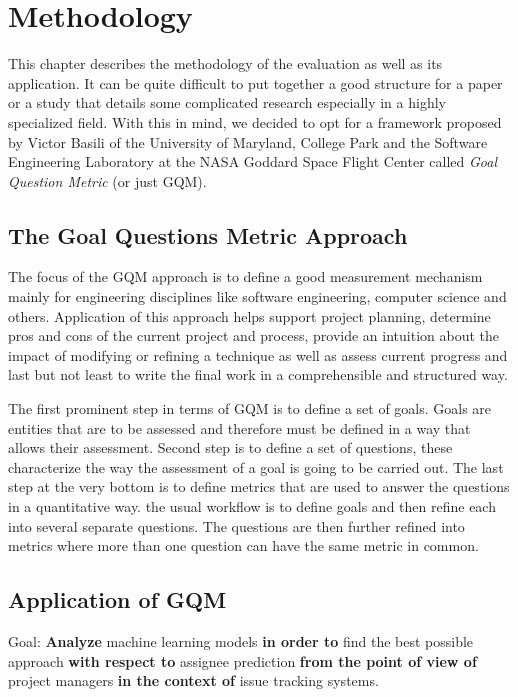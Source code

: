 \chapter{Methodology}

This chapter describes the methodology of the evaluation as well as its application. It can be quite difficult to put together a good structure for a paper or a study that details some complicated research especially in a highly specialized field. With this in mind, we decided to opt for a framework proposed by Victor Basili of the University of Maryland, College Park and the Software Engineering Laboratory at the NASA Goddard Space Flight Center called \textit{Goal Question Metric} (or just GQM).

\section{The Goal Questions Metric Approach}

The focus of the GQM approach is to define a good measurement mechanism mainly for engineering disciplines like software engineering, computer science and others. Application of this approach helps support project planning, determine pros and cons of the current project and process, provide an intuition about the impact of modifying or refining a technique as well as assess current progress and last but not least to write the final work in a comprehensible and structured way.

The first prominent step in terms of GQM is to define a set of goals. Goals are entities that are to be assessed and therefore must be defined in a way that allows their assessment. Second step is to define a set of questions, these characterize the way the assessment of a goal is going to be carried out. The last step at the very bottom is to define metrics that are used to answer the questions in a quantitative way. the usual workflow is to define goals and then refine each into several separate questions. The questions are then further refined into metrics where more than one question can have the same metric in common.

\section{Application of GQM}

Goal: \textbf{Analyze} machine learning models \textbf{in order to} find the best possible approach \textbf{with respect to} assignee prediction \textbf{from the point of view of} project managers \textbf{in the context of} issue tracking systems.